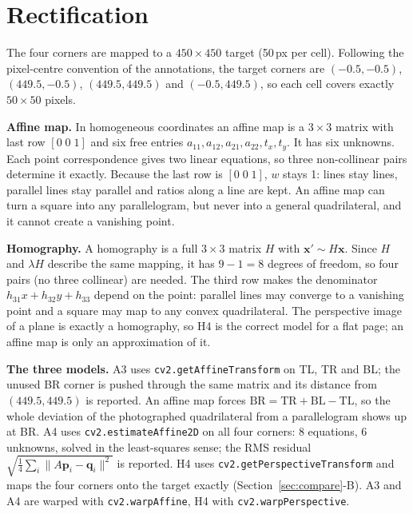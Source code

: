 \documentclass[conference]{IEEEtran}
\begin{document}
\section{Rectification}
\label{sec:rect}
The four corners are mapped to a $450\times450$ target (50\,px per cell). Following the pixel-centre convention of the annotations, the target corners are $(-0.5,-0.5)$, $(449.5,-0.5)$, $(449.5,449.5)$ and $(-0.5,449.5)$, so each cell covers exactly $50\times50$ pixels.

\textbf{Affine map.} In homogeneous coordinates an affine map is a $3\times3$ matrix with last row $[0\;0\;1]$ and six free entries $a_{11},a_{12},a_{21},a_{22},t_x,t_y$. It has six unknowns. Each point correspondence gives two linear equations, so three non-collinear pairs determine it exactly. Because the last row is $[0\;0\;1]$, $w$ stays 1: lines stay lines, parallel lines stay parallel and ratios along a line are kept. An affine map can turn a square into any parallelogram, but never into a general quadrilateral, and it cannot create a vanishing point.

\textbf{Homography.} A homography is a full $3\times3$ matrix $H$ with $\mathbf{x}'\sim H\mathbf{x}$. Since $H$ and $\lambda H$ describe the same mapping, it has $9-1=8$ degrees of freedom, so four pairs (no three collinear) are needed. The third row makes the denominator $h_{31}x+h_{32}y+h_{33}$ depend on the point: parallel lines may converge to a vanishing point and a square may map to any convex quadrilateral. The perspective image of a plane is exactly a homography, so H4 is the correct model for a flat page; an affine map is only an approximation of it.

\textbf{The three models.}
A3 uses \texttt{cv2.getAffineTransform} on TL, TR and BL; the unused BR corner is pushed through the same matrix and its distance from $(449.5,449.5)$ is reported. An affine map forces $\text{BR}=\text{TR}+\text{BL}-\text{TL}$, so the whole deviation of the photographed quadrilateral from a parallelogram shows up at BR.
A4 uses \texttt{cv2.estimateAffine2D} on all four corners: 8 equations, 6 unknowns, solved in the least-squares sense; the RMS residual $\sqrt{\tfrac14\sum_i\lVert A\mathbf{p}_i-\mathbf{q}_i\rVert^2}$ is reported. H4 uses \texttt{cv2.getPerspectiveTransform} and maps the four corners onto the target exactly (Section~\ref{sec:compare}-B). A3 and A4 are warped with \texttt{cv2.warpAffine}, H4 with \texttt{cv2.warpPerspective}.
\end{document}
